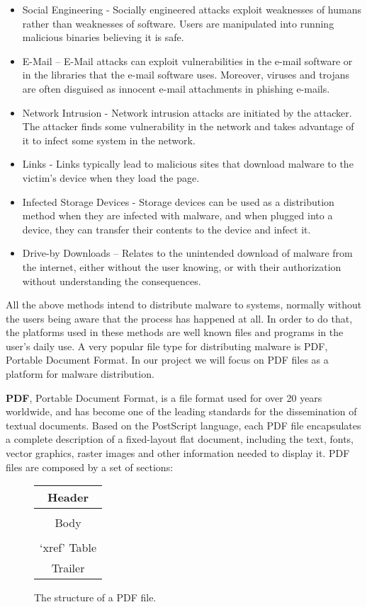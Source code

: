 \documentclass{article}
\begin{document}
\begin{itemize}
  \item Social Engineering - Socially engineered attacks exploit weaknesses of humans rather than weaknesses of software. Users are manipulated into running malicious binaries believing it is safe.
  \item E-Mail – E-Mail attacks can exploit vulnerabilities in the e-mail software or in the libraries that the e-mail software uses. Moreover, viruses and trojans are often disguised as innocent e-mail attachments in phishing e-mails.
  \item Network Intrusion - Network intrusion attacks are initiated by the attacker. The attacker finds some vulnerability in the network and takes advantage of it to infect some system in the network.
  \item Links - Links typically lead to malicious sites that download malware to the victim's device when they load the page.
  \item Infected Storage Devices - Storage devices can be used as a distribution method when they are infected with malware, and when plugged into a device, they can transfer their contents to the device and infect it.
  \item Drive-by Downloads – Relates to the unintended download of malware from the internet, either without the user knowing, or with their authorization without understanding the consequences.
\end{itemize}

\indent All the above methods intend to distribute malware to systems, normally without the users being aware that the process has happened at all. In order to do that, the platforms used in these methods are well known files and programs in the user’s daily use. A very popular file type for distributing malware is PDF, Portable Document Format. In our project we will focus on PDF files as a platform for malware distribution.

\indent \textbf{PDF}, Portable Document Format, is a file format used for over 20 years worldwide, and has become one of the leading standards for the dissemination of textual documents. Based on the PostScript language, each PDF file encapsulates a complete description of a fixed-layout flat document, including the text, fonts, vector graphics, raster images and other information needed to display it. PDF files are composed by a set of sections:

\begin{figure}[htb]
\centering
\begin{tabular}[c]{|c|}
\hline
Header\\
\hline
\\
Body\\
\\
\hline
‘xref’ Table\\
\hline
Trailer\\
\hline
\end{tabular}
\caption{The structure of a PDF file.}
\end{figure}
\end{document}
